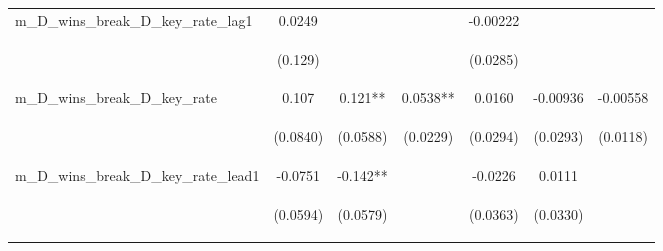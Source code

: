 \begin{tabular}{lcccccc}
m\_D\_wins\_break\_D\_key\_rate\_lag1 & 0.0249 &  &  & -0.00222 &  &  \\
\vspace{4pt} & \begin{footnotesize}(0.129)\end{footnotesize} & \begin{footnotesize}\end{footnotesize} & \begin{footnotesize}\end{footnotesize} & \begin{footnotesize}(0.0285)\end{footnotesize} & \begin{footnotesize}\end{footnotesize} & \begin{footnotesize}\end{footnotesize} \\
m\_D\_wins\_break\_D\_key\_rate & 0.107 & 0.121** & 0.0538** & 0.0160 & -0.00936 & -0.00558 \\
\vspace{4pt} & \begin{footnotesize}(0.0840)\end{footnotesize} & \begin{footnotesize}(0.0588)\end{footnotesize} & \begin{footnotesize}(0.0229)\end{footnotesize} & \begin{footnotesize}(0.0294)\end{footnotesize} & \begin{footnotesize}(0.0293)\end{footnotesize} & \begin{footnotesize}(0.0118)\end{footnotesize} \\
m\_D\_wins\_break\_D\_key\_rate\_lead1 & -0.0751 & -0.142** &  & -0.0226 & 0.0111 &  \\
\vspace{4pt} & \begin{footnotesize}(0.0594)\end{footnotesize} & \begin{footnotesize}(0.0579)\end{footnotesize} & \begin{footnotesize}\end{footnotesize} & \begin{footnotesize}(0.0363)\end{footnotesize} & \begin{footnotesize}(0.0330)\end{footnotesize} & \begin{footnotesize}\end{footnotesize} \\

\end{tabular}

